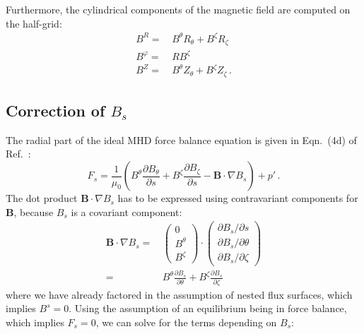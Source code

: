 Furthermore, the cylindrical components of the magnetic field
are computed on the half-grid:
\begin{align}
 B^R       =&\, B^\theta R_\theta + B^\zeta R_\zeta \\
 B^\varphi =&\, R B^\zeta \\
 B^Z       =&\, B^\theta Z_\theta + B^\zeta Z_\zeta \, .
\end{align}


\FloatBarrier
\subsection{Correction of $B_s$}
The radial part of the ideal MHD force balance equation is given in Eqn.~(4d)
of Ref.~\cite{hirshman_whitson_1983}:
\begin{equation}
 F_s = \frac{1}{\mu_0} \left(
     B^\theta  \frac{\partial B_\theta}{\partial s}
   + B^\zeta   \frac{\partial B_\zeta }{\partial s}
   - \mathbf{B} \cdot \nabla B_s
 \right) + p' \, . \label{eqn:f_rho}
\end{equation}
The dot product $\mathbf{B} \cdot \nabla B_s$ has to be expressed
using contravariant components for $\mathbf{B}$,
because $B_s$ is a covariant component:
\begin{align}
 \mathbf{B} \cdot \nabla B_s
 =&\, \begin{pmatrix}
    0 \\
    B^\theta \\
    B^\zeta
   \end{pmatrix}
   \cdot
   \begin{pmatrix}
    \partial B_s / \partial s \\
    \partial B_s / \partial \theta \\
    \partial B_s / \partial \zeta
   \end{pmatrix} \\
 =&\,  B^\theta \frac{\partial B_s}{\partial \theta}
     + B^\zeta \frac{\partial B_s}{\partial \zeta}
\end{align}
where we have already factored in the assumption of nested flux surfaces,
which implies $B^s = 0$.
Using the assumption of an equilibrium being in force balance,
which implies $F_s = 0$,
we can solve  for the terms depending on $B_s$:
